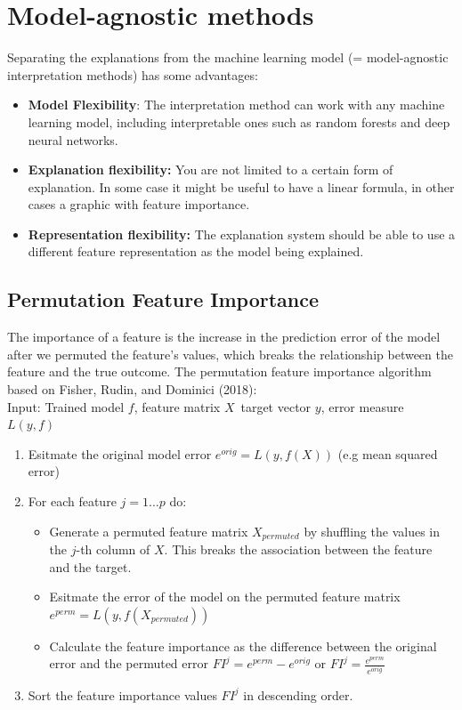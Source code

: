 \section{Model-agnostic methods}
Separating the explanations from the machine learning model (= model-agnostic interpretation methods) has some advantages:
\begin{itemize}
    \item \textbf{Model Flexibility}: The interpretation method can work with any machine learning model, including interpretable ones such as random forests and deep neural networks.
    \item \textbf{Explanation flexibility:} You are not limited to a certain form of explanation. In some case it might be useful to have a linear formula, in other cases a graphic with feature importance.
    \item \textbf{Representation flexibility:} The explanation system should be able to use a different feature representation as the model being explained.
\end{itemize}

\subsection{Permutation Feature Importance}
The importance of a feature is the increase in the prediction error of the model after we permuted the feature's values, which breaks the relationship between the feature and the true outcome.
The permutation feature importance algorithm based on Fisher, Rudin, and Dominici (2018):\\

Input: Trained model $f$, feature matrix $X$\, target vector $y$, error measure $L(y, f)$\\
\begin{enumerate}
    \item Esitmate the original model error $e^{orig}=L(y, f(X))$ (e.g mean squared error)
    \item For each feature $j=1\ldots p$ do:
    \begin{itemize}
        \item Generate a permuted feature matrix $X_{permuted}$ by shuffling the values in the $j$-th column of $X$. This breaks the association between the feature and the target.
        \item Esitmate the error of the model on the permuted feature matrix $e^{perm}=L(y, f(X_{permuted}))$
        \item Calculate the feature importance as the difference between the original error and the permuted error $FI^j=e^{perm}-e^{orig}$ or $FI^j=\frac{e^{perm}}{e^{orig}}$
    \end{itemize}
    \item Sort the feature importance values $FI^j$ in descending order.
\end{enumerate}

